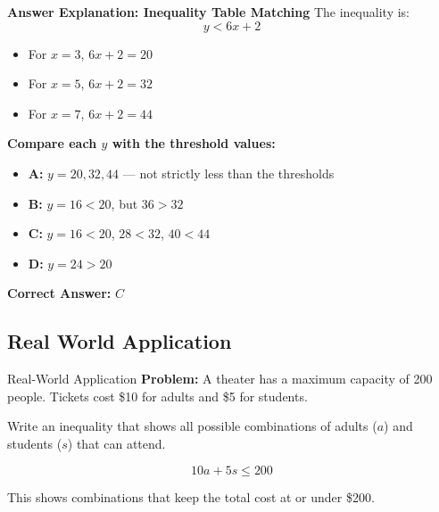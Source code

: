 \documentclass{beamer}
\begin{document}
\begin{frame}{\textbf{Answer Explanation: Inequality Table Matching}}
    \small
    The inequality is:
    \[
    y < 6x + 2
    \]

    \begin{itemize}
        \item For \(x = 3\), \(6x + 2 = 20\)
        \item For \(x = 5\), \(6x + 2 = 32\)
        \item For \(x = 7\), \(6x + 2 = 44\)
    \end{itemize}

    \textbf{Compare each \(y\) with the threshold values:}

    \begin{itemize}
        \item \textbf{A:} \(y = 20, 32, 44\) — not strictly less than the thresholds
        \item \textbf{B:} \(y = 16 < 20\), but \(36 > 32\)
        \item \textbf{C:} \(y = 16 < 20\), \(28 < 32\), \(40 < 44\)
        \item \textbf{D:} \(y = 24 > 20\)
    \end{itemize}

    \textbf{Correct Answer:} \( \boxed{C} \)
\end{frame}

\begin{frame}
\section{Real World Application}
\end{frame}

\begin{frame}{Real-World Application}
    \textbf{Problem:} A theater has a maximum capacity of 200 people. Tickets cost \$10 for adults and \$5 for students.

    Write an inequality that shows all possible combinations of adults (\(a\)) and students (\(s\)) that can attend.

    \[
    10a + 5s \le 200
    \]

    \vspace{0.3cm}
    This shows combinations that keep the total cost at or under \$200.
\end{frame}
\end{document}
